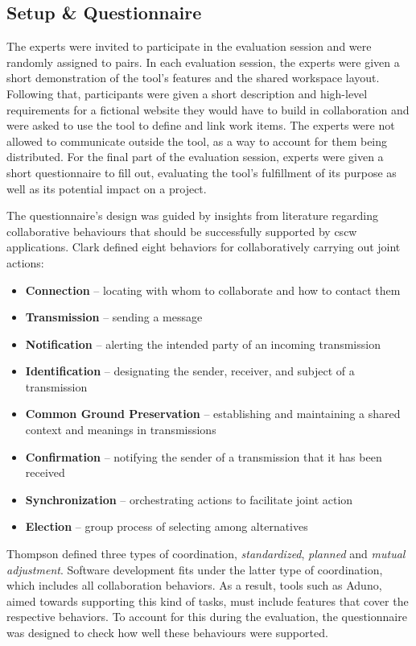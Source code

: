 \documentclass[conference]{IEEEtran}
\begin{document}
\subsection{Setup \& Questionnaire}
The experts were invited to participate in the evaluation session and were randomly assigned to pairs. In each evaluation session, the experts were given a short demonstration of the tool's features and the shared workspace layout. Following that, participants were given a short description and high-level requirements for a fictional website they would have to build in collaboration and were asked to use the tool to define and link work items. The experts were not allowed to communicate outside the tool, as a way to account for them being distributed. For the final part of the evaluation session, experts were given a short questionnaire to fill out, evaluating the tool's fulfillment of its purpose as well as its potential impact on a project.

The questionnaire's design was guided by insights from literature regarding collaborative behaviours that should be successfully supported by {\sc cscw} applications. Clark \cite{Clark96} defined eight behaviors for collaboratively carrying out joint actions:

\begin{itemize}
\item \textbf{Connection} -- locating with whom to collaborate and how to contact them
\item \textbf{Transmission} -- sending a message
\item \textbf{Notification} -- alerting the intended party of an incoming transmission
\item \textbf{Identification} -- designating the sender, receiver, and subject of a transmission
\item \textbf{Common Ground Preservation} -- establishing and maintaining a shared context and meanings in transmissions
\item \textbf{Confirmation} -- notifying the sender of a transmission that it has been received
\item \textbf{Synchronization} -- orchestrating actions to facilitate joint action
\item \textbf{Election} -- group process of selecting among alternatives
\end{itemize}

Thompson \cite{Thompson67} defined three types of coordination, \textit{standardized}, \textit{planned} and \textit{mutual adjustment}. Software development fits under the latter type of coordination, which includes all collaboration behaviors. As a result, tools such as Aduno, aimed towards supporting this kind of tasks, must include features that cover the respective behaviors. To account for this during the evaluation, the questionnaire was designed to check how well these behaviours were supported.
\end{document}
